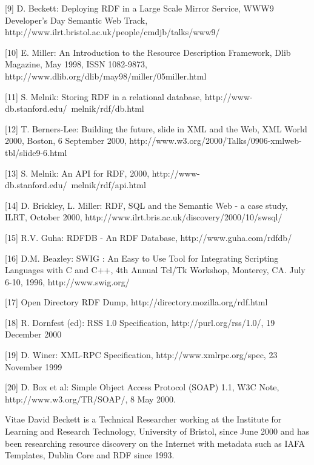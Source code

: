 \documentclass[11pt]{article}
\begin{document}
    [9] D. Beckett: Deploying RDF in a Large Scale Mirror Service, WWW9 Developer's Day Semantic Web Track, http://www.ilrt.bristol.ac.uk/people/cmdjb/talks/www9/

    [10] E. Miller: An Introduction to the Resource Description Framework, Dlib Magazine, May 1998, ISSN 1082-9873, http://www.dlib.org/dlib/may98/miller/05miller.html

    [11] S. Melnik: Storing RDF in a relational database, http://www-db.stanford.edu/~melnik/rdf/db.html

    [12] T. Berners-Lee: Building the future, slide in XML and the Web, XML World 2000, Boston, 6 September 2000, http://www.w3.org/2000/Talks/0906-xmlweb-tbl/slide9-6.html

    [13] S. Melnik: An API for RDF, 2000, http://www-db.stanford.edu/~melnik/rdf/api.html

    [14] D. Brickley, L. Miller: RDF, SQL and the Semantic Web - a case study, ILRT, October 2000, http://www.ilrt.bris.ac.uk/discovery/2000/10/swsql/

    [15] R.V. Guha: RDFDB - An RDF Database, http://www.guha.com/rdfdb/

    [16] D.M. Beazley: SWIG : An Easy to Use Tool for Integrating Scripting Languages with C and C++, 4th Annual Tcl/Tk Workshop, Monterey, CA. July 6-10, 1996, http://www.swig.org/

    [17] Open Directory RDF Dump, http://directory.mozilla.org/rdf.html

    [18] R. Dornfest (ed): RSS 1.0 Specification, http://purl.org/rss/1.0/, 19 December 2000

    [19] D. Winer: XML-RPC Specification, http://www.xmlrpc.org/spec, 23 November 1999

    [20] D. Box et al: Simple Object Access Protocol (SOAP) 1.1, W3C Note, http://www.w3.org/TR/SOAP/, 8 May 2000.

    Vitae
    David Beckett is a Technical Researcher working at the Institute for Learning and Research Technology, University of Bristol, since June 2000 and has been researching resource discovery on the Internet with metadata such as IAFA Templates, Dublin Core and RDF since 1993.
\end{document}
